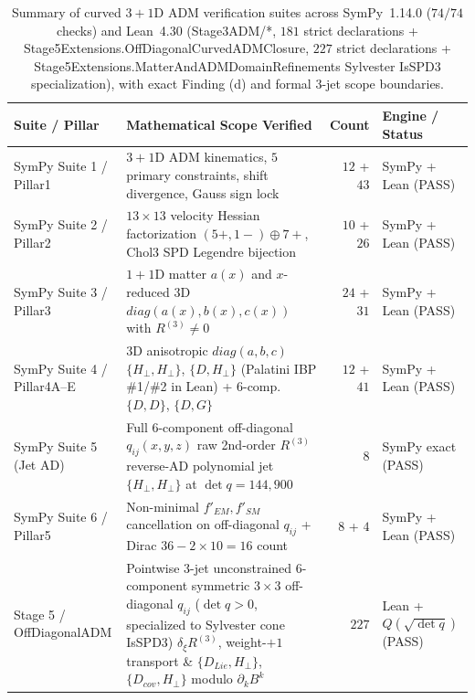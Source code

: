 \documentclass[american,11pt,letterpaper]{article}
\def\mathbb#1{#1}%
\def\mathcal#1{#1}%
\def\mathrm#1{#1}%
\def\texttt#1{#1}%
\begin{document}
\begin{table}[htbp]
\centering
\caption{Summary of curved $3+1$D ADM verification suites across SymPy~1.14.0 ($74/74$ checks) and Lean~4.30 (\texttt{Stage3ADM/*}, $181$ strict declarations + \texttt{Stage5\allowbreak{}Extensions.\allowbreak{}Off\allowbreak{}Diagonal\allowbreak{}Curved\allowbreak{}ADMClosure}, $227$ strict declarations + \texttt{Stage5\allowbreak{}Extensions.\allowbreak{}Matter\allowbreak{}And\allowbreak{}ADMDomain\allowbreak{}Refinements} Sylvester \texttt{IsSPD3} specialization), with exact \texttt{Finding (d)} and formal 3-jet scope boundaries.}
\label{tab:curved-adm-suites}
\vspace{0.4em}
\footnotesize
\begin{tabular}{|p{3.0cm}|p{7.1cm}|r|p{2.6cm}|}
\hline
\textbf{Suite / Pillar} & \textbf{Mathematical Scope Verified} & \textbf{Count} & \textbf{Engine / Status} \\
\hline
SymPy Suite 1 / \texttt{Pillar1} & $3+1$D ADM kinematics, $5$ primary constraints, shift divergence, Gauss sign lock & $12$ + $43$ & SymPy + Lean (\texttt{PASS}) \\
\hline
SymPy Suite 2 / \texttt{Pillar2} & $13\times 13$ velocity Hessian factorization $(5+,1-) \oplus 7+$, \texttt{Chol3} SPD Legendre bijection & $10$ + $26$ & SymPy + Lean (\texttt{PASS}) \\
\hline
SymPy Suite 3 / \texttt{Pillar3} & $1+1$D matter $a(x)$ and $x$-reduced 3D $\mathrm{diag}(a(x),b(x),c(x))$ with $R^{(3)} \ne 0$ & $24$ + $31$ & SymPy + Lean (\texttt{PASS}) \\
\hline
SymPy Suite 4 / \texttt{Pillar4A--E} & 3D anisotropic $\mathrm{diag}(a,b,c)$ $\{\mathcal{H}_\perp,\mathcal{H}_\perp\}$, $\{\mathcal{D},\mathcal{H}_\perp\}$ (Palatini IBP \#1/\#2 in Lean) + 6-comp.\ $\{\mathcal{D},\mathcal{D}\}$, $\{\mathcal{D},G\}$ & $12$ + $41$ & SymPy + Lean (\texttt{PASS}) \\
\hline
SymPy Suite 5 (Jet AD) & Full 6-component off-diagonal $q_{ij}(x,y,z)$ raw 2nd-order $R^{(3)}$ reverse-AD polynomial jet $\{\mathcal{H}_\perp,\mathcal{H}_\perp\}$ at $\det q = 144, 900$ & $8$ & SymPy exact (\texttt{PASS}) \\
\hline
SymPy Suite 6 / \texttt{Pillar5} & Non-minimal $f'_{\mathrm{EM}}, f'_{\mathrm{SM}}$ cancellation on off-diagonal $q_{ij}$ + Dirac $36 - 2\times 10 = 16$ count & $8$ + $4$ & SymPy + Lean (\texttt{PASS}) \\
\hline
Stage 5 / \texttt{OffDiagonalADM} & Pointwise 3-jet unconstrained 6-component symmetric $3\times 3$ off-diagonal $q_{ij}$ ($\det q > 0$, specialized to Sylvester cone \texttt{IsSPD3}) $\delta_\xi R^{(3)}$, weight-$+1$ transport \& $\{\mathcal{D}_{\mathrm{Lie}},\mathcal{H}_\perp\}$, $\{\mathcal{D}_{\mathrm{cov}},\mathcal{H}_\perp\}$ modulo $\partial_k B^k$ & $227$ & Lean + $\mathbb{Q}(\sqrt{\det q})$ (\texttt{PASS}) \\
\hline
\end{tabular}
\end{table}
\end{document}
